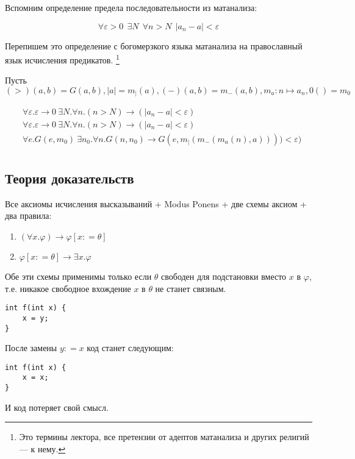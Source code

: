 Вспомним определение предела последовательности из матанализа:

\[\forall \varepsilon > 0 \ \ \exists N \ \ \forall n > N \ \ |a_n - a| < \varepsilon\]

Перепишем это определение с богомерзкого языка матанализа на православный язык исчисления предикатов. \footnote{Это термины лектора, все претензии от адептов матанализа и других религий --- к нему.}

Пусть \(( >)(a, b) = G(a, b), |a|= m_|(a), ( -)(a,b) = m_{ -}(a, b), m_a : n \mapsto a_n, 0() = m_0\)

\begin{align*}
     & \forall \varepsilon . \varepsilon \to 0\ \exists N . \forall n. (n > N) \to (|a_n - a| < \varepsilon)      \\
     & \forall \varepsilon . \varepsilon \to 0\ \exists N . \forall n. (n > N) \to (|a_n - a| < \varepsilon)      \\
     & \forall e . G(e, m_0)\ \exists n_0 . \forall n. G(n, n_0) \to G(e, m_|(m_{ -}(m_a(n), a)))) < \varepsilon) \\
\end{align*}

\subsection{Теория доказательств}

Все аксиомы исчисления высказываний + Modus Ponens + две схемы аксиом + два правила:
\begin{enumerate}
    \item \((\forall x.\varphi) \to \varphi [x : = \theta]\)
    \item \(\varphi[x : = \theta] \to \exists x.\varphi\)
\end{enumerate}
Обе эти схемы применимы только если \(\theta\) свободен для подстановки вместо \(x\) в \(\varphi\), т.е. никакое свободное вхождение \(x\) в \(\theta\) не станет связным.

\begin{example}\itemfix
    \begin{verbatim}
int f(int x) {
    x = y;
}
    \end{verbatim}

    После замены \(y : = x\) код станет следующим:
    \begin{verbatim}
int f(int x) {
    x = x;
}
    \end{verbatim}

    И код потеряет свой смысл.
\end{example}

